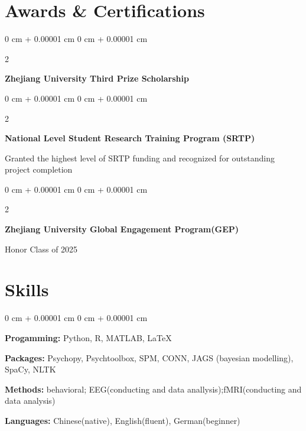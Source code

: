 \documentclass[10pt, letterpaper]{article}
\newenvironment{onecolentry}{
    \begin{adjustwidth}{
        0 cm + 0.00001 cm
    }{
        0 cm + 0.00001 cm
    }
}{
    \end{adjustwidth}
} %
\newenvironment{twocolentry}[2][]{
    \onecolentry
    \def\secondColumn{#2}
    \setcolumnwidth{\fill, 4.5 cm}
    \begin{paracol}{2}
}{
    \switchcolumn \raggedleft \secondColumn
    \end{paracol}
    \endonecolentry
} %
\begin{document}
\section{Awards \& Certifications }

        \vspace{0.2 cm}
        \begin{twocolentry}{
            2024
        }
            \textbf{Zhejiang University Third Prize Scholarship}\end{twocolentry}

        \vspace{0.1 cm}

        \begin{twocolentry}{
            2024
        }
            \textbf{National Level Student Research Training Program (SRTP)}\end{twocolentry}
            Granted the highest level of SRTP funding and recognized for outstanding project completion

        \vspace{0.1 cm}

        \begin{twocolentry}{
            2021
        }
            \textbf{Zhejiang University Global Engagement Program(GEP)}\end{twocolentry}
            Honor Class of 2025
        
\section{Skills}
        
        \begin{onecolentry}
            \item \textbf{Progamming:} Python, R, MATLAB, LaTeX
            \item \textbf{Packages:} Psychopy, Psychtoolbox, SPM, CONN, JAGS (bayesian modelling), SpaCy, NLTK
            \item \textbf{Methods:} behavioral; EEG(conducting and data anallysis);fMRI(conducting and data analysis)
            \item  \textbf{Languages:} Chinese(native), English(fluent), German(beginner)

        \end{onecolentry}
\end{document}
